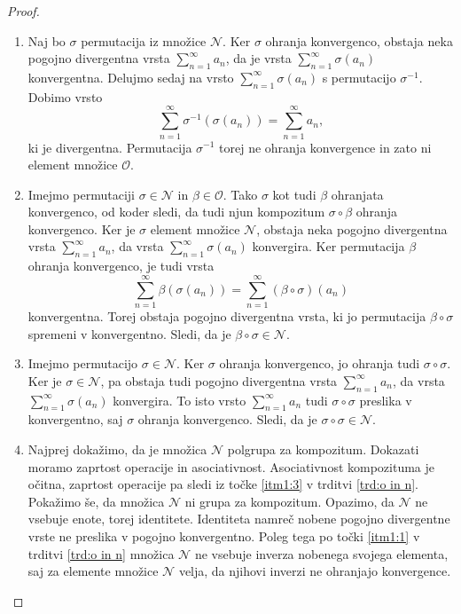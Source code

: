 \documentclass[12pt,a4paper,reqno]{amsart}
\theoremstyle{definition} %
\theoremstyle{plain} %
\begin{document}
\begin{proof}
\begin{enumerate}
\item Naj bo $\sigma$ permutacija iz množice $\mathcal{N}$. Ker $\sigma$ ohranja konvergenco, obstaja neka pogojno divergentna vrsta $\sum_{n=1}^{\infty}a_n$, da je vrsta $\sum_{n=1}^{\infty}\sigma(a_n)$ konvergentna. Delujmo sedaj na vrsto  $\sum_{n=1}^{\infty}\sigma(a_n)$ s permutacijo $\sigma^{-1}$. Dobimo vrsto $$\sum_{n=1}^{\infty}\sigma^{-1}(\sigma(a_n))=\sum_{n=1}^{\infty}a_n,$$
ki je divergentna. Permutacija $\sigma^{-1}$ torej ne ohranja konvergence in zato ni element množice $\mathcal{O}$.\\

\item Imejmo permutaciji $\sigma \in \mathcal{N}$ in $\beta \in \mathcal{O}$. Tako $\sigma$ kot tudi $\beta$ ohranjata konvergenco, od koder sledi, da tudi njun kompozitum $\sigma \circ \beta$ ohranja konvergenco. Ker je $\sigma$ element množice $\mathcal{N}$, obstaja neka pogojno divergentna vrsta $\sum_{n=1}^{\infty}a_n$, da vrsta $\sum_{n=1}^{\infty}\sigma(a_n)$ konvergira. Ker permutacija $\beta$ ohranja konvergenco, je tudi vrsta $$\sum_{n=1}^{\infty}\beta(\sigma(a_n))=\sum_{n=1}^{\infty}(\beta \circ \sigma)(a_n)$$
konvergentna. Torej obstaja pogojno divergentna vrsta, ki jo permutacija $\beta \circ \sigma$ spremeni v konvergentno. Sledi, da je $\beta \circ \sigma \in \mathcal{N}$.\\

\item Imejmo permutacijo $\sigma \in \mathcal{N}$. Ker $\sigma$ ohranja konvergenco, jo ohranja tudi $\sigma \circ \sigma$. Ker je $\sigma \in \mathcal{N}$, pa obstaja tudi pogojno divergentna vrsta $\sum_{n=1}^{\infty}a_n$, da vrsta $\sum_{n=1}^{\infty}\sigma(a_n)$ konvergira. To isto vrsto $\sum_{n=1}^{\infty}a_n$ tudi $\sigma \circ \sigma$ preslika v konvergentno, saj $\sigma$ ohranja konvergenco. Sledi, da je $\sigma \circ \sigma \in \mathcal{N}$.\\

\item Najprej dokažimo, da je množica $\mathcal{N}$ polgrupa za kompozitum. Dokazati moramo zaprtost operacije in asociativnost. Asociativnost kompozituma je očitna, zaprtost operacije pa sledi iz točke \ref{itm1:3} v trditvi \ref{trd:o in n}. Pokažimo še, da množica $\mathcal{N}$ ni grupa za kompozitum. Opazimo, da $\mathcal{N}$ ne vsebuje enote, torej identitete. Identiteta namreč nobene pogojno divergentne vrste ne preslika v pogojno konvergentno. Poleg tega po točki \ref{itm1:1} v trditvi \ref{trd:o in n} množica $\mathcal{N}$ ne vsebuje inverza nobenega svojega elementa, saj za elemente množice $\mathcal{N}$ velja, da njihovi inverzi ne ohranjajo konvergence.
\end{enumerate}
\end{proof}
\end{document}
